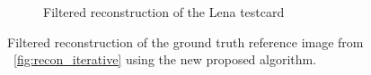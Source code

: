 \documentclass{osa-article}
\begin{document}
\begin{figure}
\begin{subfigure}[t]{0.3\linewidth}
    \caption{Filtered reconstruction of the Lena testcard}
  \end{subfigure}
  \hspace*{\fill}
  \caption[Filtered reconstruction of the ground truth reference image using the new proposed algorithm.]{
    Filtered reconstruction of the ground truth reference image from \figurename~\ref{fig:recon_iterative} using the new proposed algorithm.
  }\label{fig:flopt_filter}
\end{figure}
\end{document}
